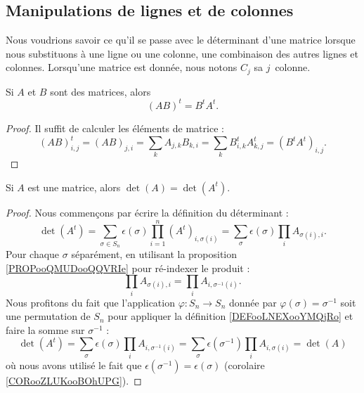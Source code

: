 \subsection{Manipulations de lignes et de colonnes}

Nous voudrions savoir ce qu'il se passe avec le déterminant d'une matrice lorsque nous substituons à une ligne ou une colonne, une combinaison des autres lignes et colonnes. Lorsqu'une matrice est donnée, nous notons \( C_j\) sa \( j\)\ieme\ colonne.

\begin{lemma}        \label{LEMooRSJTooQEoOtN}
	Si \( A\) et \( B\) sont des matrices, alors
	\begin{equation}
		(AB)^t=B^tA^t.
	\end{equation}
\end{lemma}

\begin{proof}
	Il suffit de calculer les éléments de matrice :
	\begin{equation}
		(AB)^t_{i,j}=(AB)_{j,i}=\sum_k A_{j,k}B_{k,i}=\sum_k B^t_{i,k}A^t_{k,j}=(B^tA^t)_{i,j}.
	\end{equation}
\end{proof}

\begin{lemma}             \label{LEMooCEQYooYAbctZ}
	Si \( A\) est une matrice, alors \( \det(A)=\det(A^t)\).
\end{lemma}

\begin{proof}
	Nous commençons par écrire la définition du déterminant :
	\begin{equation}
		\det(A^t)=\sum_{\sigma\in S_n}\epsilon(\sigma)\prod_{i=1}^n (A^t)_{i,\sigma(i)}=\sum_{\sigma} \epsilon(\sigma)\prod_i A_{\sigma(i),i}.
	\end{equation}
	Pour chaque \( \sigma\) séparément, en utilisant la proposition \ref{PROPooQMUDooQQVRIe} pour ré-indexer le produit :
	\begin{equation}
		\prod_i A_{\sigma(i),i}=\prod_i A_{i,\sigma^{-1}(i)}.
	\end{equation}
	Nous profitons du fait que l'application \( \varphi\colon S_n\to S_n\) donnée par \( \varphi(\sigma)=\sigma^{-1}\) soit une permutation de \( S_n\) pour appliquer la définition \ref{DEFooLNEXooYMQjRo} et faire la somme sur \( \sigma^{-1}\) :
	\begin{equation}
		\det(A^t)=\sum_{\sigma}\epsilon(\sigma)\prod_iA_{i,\sigma^{-1}(i)}=\sum_{\sigma}\epsilon(\sigma^{-1})\prod_iA_{i,\sigma(i)}=\det(A)
	\end{equation}
	où nous avons utilisé le fait que \(\epsilon(\sigma^{-1})=\epsilon(\sigma)\) (corolaire \ref{CORooZLUKooBOhUPG}).
\end{proof}

